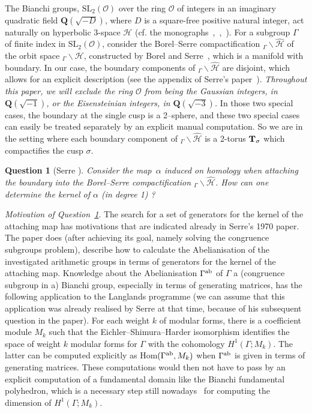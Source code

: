 \documentclass[twoside,a4paper,12 pt]{amsart}
\newcommand{\ringO}{\mathcal{O}}
\newcommand{\Hy}{\mathcal{H}}
\newcommand{\T}{{\bf{T}}}
\newcommand{\rationals}{{\mathbf{Q}}}
\theoremstyle{plain}
\newtheorem{question}[theorem]{\bfseries Question}
\theoremstyle{definition}
\theoremstyle{remark}
\begin{document}
The Bianchi groups, $\mathrm{SL_2}(\ringO)$ over the ring $\ringO$ of integers in an imaginary quadratic field $\rationals(\sqrt{-D})$, 
where $D$ is a square-free positive natural integer,
act naturally on hyperbolic $3$-space $\Hy$ (cf. the monographs~\cite{ElstrodtGrunewaldMennicke},~\cite{Fine},~\cite{MaclachlanReid}).
For a subgroup $\Gamma$ of finite index in $\mathrm{SL_2}(\ringO)$,
 consider the Borel--Serre compactification $_\Gamma \backslash \widehat{\Hy}$ of the orbit space $_\Gamma \backslash \Hy$,
constructed by Borel and Serre~\cite{BorelSerre}, which is a manifold with boundary.
In our case, the boundary components of $_\Gamma \backslash \widehat{\Hy}$ are disjoint,
which allows for an explicit description (see the appendix of Serre's paper~\cite{Serre}).
\textit{Throughout this paper, we will exclude the ring $\ringO$ from being the Gaussian integers, in $\rationals(\sqrt{-1})$,
or the Eisensteinian integers, in $\rationals(\sqrt{-3})$.}
In those two special cases, the boundary at the single cusp is a 2--sphere, and these two special cases can easily be treated separately by an explicit manual computation. 
So we are in the setting where each boundary component of $_\Gamma \backslash \widehat{\Hy}$ is a 2-torus $\T_\sigma$ which compactifies the cusp $\sigma$.
\begin{question}[Serre \cite{Serre}]\label{question}
 Consider the map~$\alpha$
 induced on homology when attaching the boundary
 into the Borel--Serre compactification $_\Gamma \backslash \widehat{\Hy}$.
How can one determine the kernel of $\alpha$ (in degree 1) ?
\end{question}

\textit{Motivation of Question~\ref{question}}.
The search for a set of generators for the kernel of the attaching map has motivations that are indicated already in Serre's 1970 paper.
The paper does (after achieving its goal, namely solving the congruence subgroups problem), 
describe how to calculate the Abelianisation of the investigated arithmetic groups in terms of generators for the kernel of the attaching map. 
Knowledge about the Abelianisation $\Gamma^{\rm ab}$ of $\Gamma$ a (congruence subgroup in a) Bianchi group, especially in terms of generating matrices, has the following application to the Langlands programme 
(we can assume that this application was already realised by Serre at that time, because of his subsequent question in the paper).
For each weight $k$ of modular forms, there is a coefficient module $M_k$ such that the Eichler--Shimura--Harder isomorphism identifies the space of weight $k$ modular forms for $\Gamma$
with the cohomology $H^1(\Gamma; M_k)$. The latter can be computed explicitly as Hom$(\Gamma^{\rm ab} , M_k)$ when $\Gamma^{\rm ab}$ is given in terms of generating matrices.
These computations would then not have to pass by an explicit computation of a fundamental domain like the Bianchi fundamental polyhedron,
which is  a necessary step still nowadays~\cites{RahmSengun, RahmTsaknias} for computing the dimension of $H^1(\Gamma; M_k)$.
\end{document}
